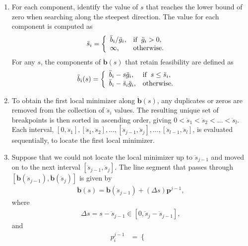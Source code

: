 \documentclass[11pt]{article}
\newcommand{\0}{\phantom{0}}
\begin{document}
\begin{enumerate}
	\item For each component, identify the value of $s$ that reaches the lower bound of zero when searching along the steepest direction. The value for each component is computed as
	\begin{align*}
	\ddot{s}_{i} & =
	\left\{\begin{array}{ll}
	\ddot{b}_{i} / \ddot{g}_{i}, & \mbox{$\text{if} \hspace{2mm} \ddot{g}_{i} > 0,$}\\
	\infty, & \mbox{otherwise}.
	\end{array}\right.
	\end{align*}
	For any $s$, the components of $\ddot{\bm{b}}(s)$ that retain feasibility are defined as
	\begin{align*}
	\ddot{b}_{i}(s) & =
	\left\{\begin{array}{ll}
	\ddot{b}_{i} - s\ddot{g}_{i}, & \mbox{$\text{if} \hspace{2mm} s \leq \ddot{s}_{i},$}\\
	\ddot{b}_{i} - \ddot{s}_{i}\ddot{g}_{i}, & \mbox{otherwise}.
	\end{array}\right.
	\end{align*}
	\item To obtain the first local minimizer along $\ddot{\bm{b}}(s)$, any duplicates or zeros are removed from the collection of $\ddot{s}_{i}$ values. The resulting unique set of breakpoints is then sorted in ascending order, giving $0 < \ddot{s}_{1} < \ddot{s}_{2} < \dots < \ddot{s}_{l}$. Each interval, $[0, \ddot{s}_{1}], [\ddot{s}_{1}, \ddot{s}_{2}], \dots, [\ddot{s}_{j-1}, \ddot{s}_{j}], \dots, [\ddot{s}_{l-1}, \ddot{s}_{l}]$, is evaluated sequentially, to locate the first local minimizer. 
	\item Suppose that we could not locate the local minimizer up to $\ddot{s}_{j-1}$ and moved on to the next interval $[\ddot{s}_{j-1}, \ddot{s}_{j}]$. The line segment that passes through $[\ddot{\bm{b}}(\ddot{s}_{j-1}), \ddot{\bm{b}}(\ddot{s}_{j})]$ is given by
	\begin{align*}
	\ddot{\bm{b}}(s) = \ddot{\bm{b}}(\ddot{s}_{j-1}) + (\Delta s)\bm{p}^{j-1},
	\end{align*}
	where
	\begin{align*}
	\Delta s = s - \ddot{s}_{j-1} \in [0, \ddot{s}_{j} - \ddot{s}_{j-1}],
	\end{align*}
	and 
	\begin{align*}
	p_{i}^{j-1} & = 
	\left\{\begin{array}{ll}

\end{array}
\end{align*}
\end{enumerate}
\end{document}
